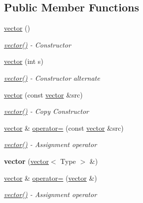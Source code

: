 \subsection*{Public Member Functions}
\begin{DoxyCompactItemize}
\item 
\hyperlink{classvector_ab8d8ebaa9b91a05bb7a94371cb84c042}{vector} ()
\begin{DoxyCompactList}\small\item\em \hyperlink{classvector_ab8d8ebaa9b91a05bb7a94371cb84c042}{vector()} -\/ Constructor \end{DoxyCompactList}\item 
\hyperlink{classvector_a98cdf37dc536057976131f5f9bb8e402}{vector} (int s)
\begin{DoxyCompactList}\small\item\em \hyperlink{classvector_ab8d8ebaa9b91a05bb7a94371cb84c042}{vector()} -\/ Constructor alternate \end{DoxyCompactList}\item 
\hyperlink{classvector_a09bcb733130a4b75eab388d79a6ad1c6}{vector} (const \hyperlink{classvector}{vector} \&src)
\begin{DoxyCompactList}\small\item\em \hyperlink{classvector_ab8d8ebaa9b91a05bb7a94371cb84c042}{vector()} -\/ Copy Constructor \end{DoxyCompactList}\item 
\hyperlink{classvector}{vector} \& \hyperlink{classvector_a4de09f8f1844cead9daef18122e3cdf6}{operator=} (const \hyperlink{classvector}{vector} \&src)
\begin{DoxyCompactList}\small\item\em \hyperlink{classvector_ab8d8ebaa9b91a05bb7a94371cb84c042}{vector()} -\/ Assignment operator \end{DoxyCompactList}\item 
\hypertarget{classvector_afbb927ea4d353b71b4b5cd13fa67d598}{}\label{classvector_afbb927ea4d353b71b4b5cd13fa67d598} 
{\bfseries vector} (\hyperlink{classvector}{vector}$<$ Type $>$ \&)
\item 
\hyperlink{classvector}{vector} \& \hyperlink{classvector_acbbf4dfffea32b7145d7bb24dd3a0df2}{operator=} (\hyperlink{classvector}{vector} \&)
\begin{DoxyCompactList}\small\item\em \hyperlink{classvector_ab8d8ebaa9b91a05bb7a94371cb84c042}{vector()} -\/ Assignment operator \end{DoxyCompactList}\item 

\end{DoxyCompactItemize}
